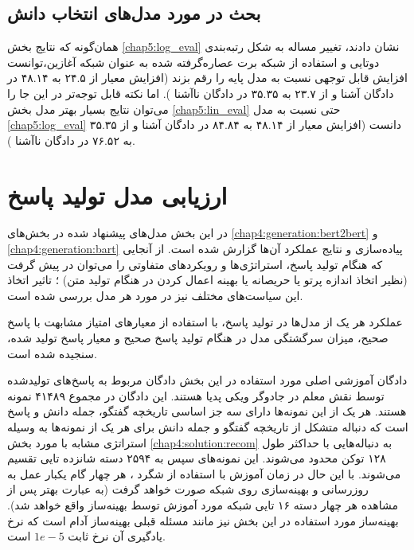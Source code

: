 \subsection{بحث در مورد مدل‌های انتخاب دانش}

همان‌گونه که نتایج بخش 
\ref{chap5:log_eval}
نشان دادند، تغییر مساله به شکل رتبه‌بندی دوتایی و استفاده از شبکه برت عصاره‌گرفته شده به عنوان شبکه آغازین،‌توانست افزایش قابل توجهی نسبت به مدل پایه را رقم بزند (افزایش معیار
از ۲۴.۵ به ۴۸.۱۴ در دادگان آشنا و از ۲۳.۷ به ۳۵.۳۵ در دادگان ناآشنا
).
اما نکته قابل توجه‌تر در این جا را می‌توان نتایج بسیار بهتر مدل بخش
\ref{chap5:lin_eval}
حتی نسبت به مدل 
\ref{chap5:log_eval}
دانست (افزایش معیار
از ۴۸.۱۴ به ۸۴.۸۴ در دادگان آشنا و از ۳۵.۳۵ به ۷۶.۵۲ در دادگان ناآشنا
).

\section{ارزیابی مدل تولید پاسخ}

در این بخش مدل‌های پیشنهاد شده در بخش‌های 
\ref{chap4:generation:bert2bert}
و
\ref{chap4:generation:bart}
پیاده‌سازی و نتایج عملکرد آن‌ها گزارش شده است. از آنجایی که هنگام تولید پاسخ، استراتژی‌ها و رویکرد‌های متفاوتی را می‌توان در پیش گرفت (نظیر اتخاذ اندازه پرتو یا حریصانه یا بهینه اعمال کردن در هنگام تولید متن) ؛ تاثیر اتخاذ این سیاست‌های مختلف نیز در مورد هر مدل بررسی شده است.

عملکرد هر یک از مدل‌ها در تولید پاسخ، با استفاده از معیار‌های امتیاز مشابهت
با پاسخ صحیح، میزان سرگشتگی مدل در هنگام تولید پاسخ صحیح و معیار
پاسخ تولید شده، سنجیده شده است.

دادگان آموزشی اصلی مورد استفاده در این بخش دادگان  مربوط به پاسخ‌های تولیدشده توسط نقش معلم در جادوگر ویکی پدیا هستند. این دادگان در مجموع ۴۱۴۸۹ نمونه هستند. هر یک از این نمونه‌ها دارای سه جز اساسی تاریخچه گفتگو، جمله دانش و پاسخ است که دنباله متشکل از تاریخچه گفتگو و جمله دانش برای هر یک از نمونه‌ها به وسیله استراتژی مشابه با مورد بخش
\ref{chap4:solution:recom}
به دنباله‌هایی با حداکثر طول ۱۲۸ توکن محدود می‌شوند. این نمونه‌های سپس به ۲۵۹۴ دسته شانزده تایی تقسیم می‌شوند. با این حال در زمان آموزش با استفاده از شگرد 
، هر چهار گام یکبار عمل به روزرسانی و بهینه‌سازی روی شبکه صورت خواهد گرفت (به عبارت بهتر پس از مشاهده هر چهار دسته ۱۶ تایی شبکه مورد آموزش توسط بهینه‌ساز واقع خواهد شد). بهینه‌ساز مورد استفاده در این بخش نیز مانند مسئله قبلی بهینه‌ساز آدام است که نرخ یادگیری آن نرخ ثابت 
$1e-5$
است. 

